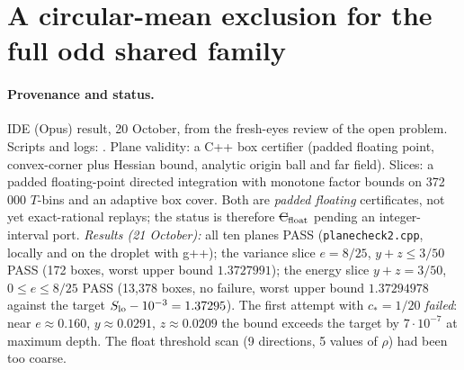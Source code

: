 \section{A circular-mean exclusion for the full odd shared family}\label{ch:circular-mean-exclusion}

\paragraph{Provenance and status.} IDE (Opus) result, 20 October, from the fresh-eyes review of the open problem. Scripts and logs:
. Plane validity: a C++ box certifier (padded floating point, convex-corner plus Hessian bound, analytic origin ball and far
field). Slices: a padded floating-point directed integration with monotone factor bounds on 372\,000 $T$-bins and an adaptive box cover. Both are \emph{padded
floating} certificates, not yet exact-rational replays; the status is therefore \st{C$_{\rm float}$} pending an integer-interval port.
\emph{Results (21 October):} all ten planes PASS (\texttt{planecheck2.cpp}, locally and on the droplet with g++); the variance slice $e=8/25$, $y+z\le3/50$ PASS
(172 boxes, worst upper bound $1.3727991$); the energy slice $y+z=3/50$, $0\le e\le8/25$ PASS (13{,}378 boxes, no failure, worst upper bound $1.37294978$ against the
target $S_{\rm lo}-10^{-3}=1.37295$). The first attempt with $c_*=1/20$ \emph{failed}: near $e\approx0.160$, $y\approx0.0291$, $z\approx0.0209$ the bound exceeds the
target by $7\cdot10^{-7}$ at maximum depth. The float threshold scan (9 directions, 5 values of $\rho$) had been too coarse.

